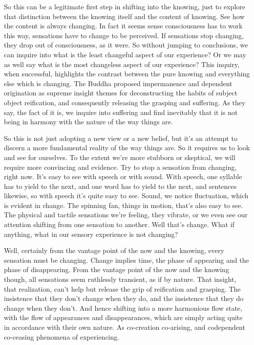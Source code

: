 \documentclass[12pt,openany]{book}
\begin{document}
So this can be a legitimate first step in shifting into the knowing, just to explore that distinction between the knowing itself and the content of knowing. See how the content is always changing. In fact it seems sense consciousness has to work this way, sensations have to change to be perceived. If sensations stop \linebreak changing, they drop out of consciousness, as it were. So without jumping to conclusions, we can inquire into what is the least changeful aspect of our experience? Or we may as well say what is the most changeless aspect of our experience? This inquiry, when successful, highlights the contrast between the pure knowing and everything else which is changing. The Buddha proposed impermanence and dependent origination as supreme insight themes for deconstructing the habits of subject object reification, and consequently releasing the grasping and suffering. As they say, the fact of it is, we inquire into  suffering and find inevitably that it is not being in harmony with the nature of the way things are.

So this is not just adopting a new view or a new belief, but it's an attempt to discern a more fundamental reality of the way things are. So it requires us to look and see for ourselves. To the extent we're more stubborn or skeptical, we will require more convincing and evidence. Try to stop a sensation from changing, right now. It's easy to see with speech or with sound. With speech, one syllable has to yield to the next, and one word has to yield to the next, and sentences likewise, so with speech it's quite easy to see. Sound, we notice fluctuation, which is evident in change. The spinning fan, things in motion, that's also easy to see. The physical and tactile sensations we're feeling, they vibrate, or we even see our attention shifting from one sensation to another. Well that's change. What if anything, what in our sensory experience is not changing?

Well, certainly from the vantage point of the now and the \linebreak knowing, every sensation must be changing. Change implies \linebreak time, the phase of appearing and the phase of disappearing. From the vantage point of the now and the knowing though, all sensations seem ruthlessly transient, as if by nature. That insight, that realization, can't help but release the grip of reification and grasping. The insistence that they don't change when they do, and the insistence that they do change when they don't. And hence shifting into a more harmonious flow state, with the flow of appearances and disappearances, which are simply acting quite in accordance with their own nature. As co-creation co-arising, and codependent co-ceasing phenomena of experiencing. 
\end{document}
